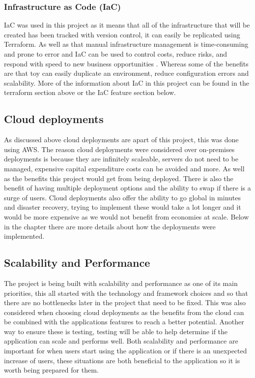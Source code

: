 \documentclass[]{project_report}
\begin{document}
\subsubsection{Infrastructure as Code (IaC)}

IaC was used in this project as it means that all of the infrastructure that will be created has been tracked with version control, it can easily be replicated using Terraform. As well as that manual infrastructure management is time-consuming and prone to error and IaC can be used to control costs, reduce risks, and respond with speed to new business opportunities \cite{aws_iac}. Whereas some of the benefits are that toy can easily duplicate an environment, reduce configuration errors and scalability. More of the information about IaC in this project can be found in the terraform section above or the IaC feature section below.

\subsection{Cloud deployments}

As discussed above cloud deployments are apart of this project, this was done using AWS. The reason cloud deployments were considered over on-premises deployments is because they are infinitely scaleable, servers do not need to be managed, expensive capital expenditure costs can be avoided and more. As well as the benefits this project would get from being deployed. There is also the benefit of having multiple deployment options and the ability to swap if there is a surge of users. Cloud deployments also offer the ability to go global in minutes \cite{aws_benefits} and disaster recovery, trying to implement these would take a lot longer and it would be more expensive as we would not benefit from economies at scale. Below in the  chapter there are more details about how the deployments were implemented.

\subsection{Scalability and Performance}

The project is being built with scalability and performance as one of its main priorities, this all started with the technology and framework choices and so that there are no bottlenecks later in the project that need to be fixed. This was also considered when choosing cloud deployments as the benefits from the cloud can be combined with the applications features to reach a better potential. Another way to ensure these is testing, testing will be able to help determine if the application can scale and performs well. Both scalability and performance are important for when users start using the application or if there is an unexpected increase of users, these situations are both beneficial to the application so it is worth being prepared for them.
\end{document}
